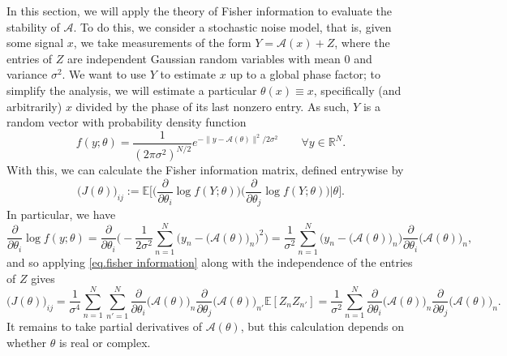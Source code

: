 \documentclass[times,10pt]{elsarticle}
\theoremstyle{plain}
\begin{document}
In this section, we will apply the theory of Fisher information to evaluate the stability of $\mathcal{A}$.
To do this, we consider a stochastic noise model, that is, given some signal $x$, we take measurements of the form $Y=\mathcal{A}(x)+Z$, where the entries of $Z$ are independent Gaussian random variables with mean $0$ and variance $\sigma^2$.
We want to use $Y$ to estimate $x$ up to a global phase factor; to simplify the analysis, we will estimate a particular $\theta(x)\equiv x$, specifically (and arbitrarily) $x$ divided by the phase of its last nonzero entry.
As such, $Y$ is a random vector with probability density function
\begin{equation*}
f(y;\theta)
=\frac{1}{(2\pi \sigma^2)^{N/2}}e^{-\|y-\mathcal{A}(\theta)\|^2/2\sigma^2}
\qquad
\forall y\in\mathbb{R}^N.
\end{equation*}
With this, we can calculate the Fisher information matrix, defined entrywise by
\begin{equation}
\label{eq.fisher information}
\big(J(\theta)\big)_{ij}
:=\mathbb{E}\bigg[\bigg(\frac{\partial}{\partial\theta_i}\log f(Y;\theta)\bigg)\bigg(\frac{\partial}{\partial\theta_j}\log f(Y;\theta)\bigg)\bigg|\theta\bigg].
\end{equation}
In particular, we have
\begin{equation*}
\frac{\partial}{\partial\theta_i}\log f(y;\theta)
=\frac{\partial}{\partial\theta_i}\bigg(-\frac{1}{2\sigma^2}\sum_{n=1}^N\Big(y_n-\big(\mathcal{A}(\theta)\big)_n\Big)^2\bigg)
=\frac{1}{\sigma^2}\sum_{n=1}^N\Big(y_n-\big(\mathcal{A}(\theta)\big)_n\Big)\frac{\partial}{\partial\theta_i}\big(\mathcal{A}(\theta)\big)_n,
\end{equation*}
and so applying \eqref{eq.fisher information} along with the independence of the entries of $Z$ gives
\begin{equation*}
\big(J(\theta)\big)_{ij}
=\frac{1}{\sigma^4}\sum_{n=1}^N\sum_{n'=1}^N\frac{\partial}{\partial\theta_i}\big(\mathcal{A}(\theta)\big)_n\frac{\partial}{\partial\theta_j}\big(\mathcal{A}(\theta)\big)_{n'}\mathbb{E}[Z_nZ_{n'}]
=\frac{1}{\sigma^2}\sum_{n=1}^N\frac{\partial}{\partial\theta_i}\big(\mathcal{A}(\theta)\big)_n\frac{\partial}{\partial\theta_j}\big(\mathcal{A}(\theta)\big)_{n}.
\end{equation*}
It remains to take partial derivatives of $\mathcal{A}(\theta)$, but this calculation depends on whether $\theta$ is real or complex.
\end{document}
